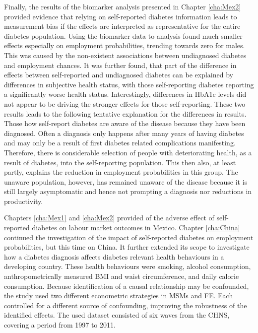 Finally, the results of the biomarker analysis presented in Chapter \ref{cha:Mex2} provided evidence that relying on self-reported diabetes information leads to measurement bias if the effects are interpreted as representative for the entire diabetes population. Using the biomarker data to analysis found much smaller effects especially on employment probabilities, trending towards zero for males. This was caused by the non-existent associations between undiagnosed diabetes and employment chances. It was further found, that part of the difference in effects between self-reported and undiagnosed diabetes can be explained by differences in subjective health status, with those self-reporting diabetes reporting a significantly worse health status. Interestingly, differences in \ac{HbA1c} levels did not appear to be driving the stronger effects for those self-reporting. These two results leads to the following tentative explanation for the differences in results. Those how self-report diabetes are aware of the disease because they have been diagnosed. Often a diagnosis only happens after many years of having diabetes and may only be a result of first diabetes related complications manifesting. Therefore, there is considerable selection of people with deteriorating health, as a result of diabetes, into the self-reporting population. This then also, at least partly, explains the reduction in employment probabilities in this group. The unaware population, however, has remained unaware of the disease because it is still largely asymptomatic and hence not prompting a diagnosis nor reductions in productivity.  %

Chapters \ref{cha:Mex1} and \ref{cha:Mex2} provided of the adverse effect of self-reported diabetes on labour market outcomes in Mexico. Chapter \ref{cha:China} continued the investigation of the impact of self-reported diabetes on employment probabilities, but this time on China. It further extended its scope to investigate how a diabetes diagnosis affects diabetes relevant health behaviours in a developing country. These health behaviours were smoking, alcohol consumption, anthropometrically measured \ac{BMI} and waist circumference, and daily calorie consumption. Because identification of a causal relationship may be confounded, the study used two different econometric strategies in \aclp{MSM} and \ac{FE}. Each controlled for a different source of confounding, improving the robustness of the identified effects. The used dataset consisted of six waves from the \acl{CHNS}, covering a period from 1997 to 2011.

